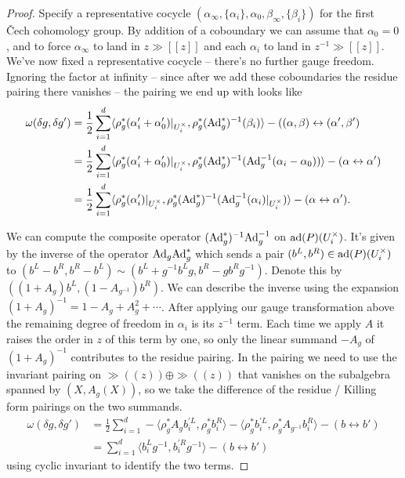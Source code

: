 \documentclass[10pt, oneside]{article}
\newcommand{\Ad}{\mr{Ad}}
\begin{document}
\begin{proof}
 Specify a representative cocycle $(\alpha_\infty, \{\alpha_i\}, \alpha_0, \beta_\infty, \{\beta_i\})$ for the first \v Cech cohomology group. By addition of a coboundary we can assume that $\alpha_0=0$, and to force $\alpha_\infty$ to land in $z\gg[[z]]$ and each $\alpha_i$ to land in $z^{-1}\gg[[z]]$.  We've now fixed a representative cocycle -- there's no further gauge freedom.  Ignoring the factor at infinity -- since after we add these coboundaries the residue pairing there vanishes -- the pairing we end up with looks like 
\begin{align*}
\omega(\delta g, \delta g') &= \frac 12 \sum_{i=1}^d \langle \rho_g^*(\alpha'_i + \alpha'_0)|_{U^\times_i},\rho_g^* (\Ad_g^*)^{-1}( \beta_i) \rangle - ((\alpha,\beta) \leftrightarrow (\alpha',\beta')\\ 
&= \frac 12 \sum_{i=1}^d \langle \rho_g^*(\alpha'_i + \alpha'_0)|_{U^\times_i}, \rho_g^*(\Ad_g^*)^{-1}(\Ad_g^{-1}(\alpha_i - \alpha_0)) \rangle - (\alpha \leftrightarrow \alpha')\\
&= \frac 12 \sum_{i=1}^d \langle \rho_g^*(\alpha'_i)|_{U^\times_i}, \rho_g^*(\Ad_g^*)^{-1}(\Ad_g^{-1}(\alpha_i)|_{U^\times_i}) \rangle - (\alpha \leftrightarrow \alpha').
\end{align*}

We can compute the composite operator $(\Ad_g^*)^{-1}\Ad_g^{-1}$ on $\mathrm{ad}(P)(U^\times_i)$.  It's given by the inverse of the operator $\Ad_g\Ad_g^*$ which sends a pair $(b^L, b^R) \in \mathrm{ad}(P)(U^\times_i)$ to $(b^L - b^R, b^R - b^L) \sim (b^L + g^{-1} b^L g, b^R - g b^R g^{-1})$.  Denote this by $((1+A_g)b^L,(1-A_{g^{-1}})b^R)$.  We can describe the inverse using the expansion $(1+A_g)^{-1} = 1 - A_g + A_g^2 + \cdots$.  After applying our gauge transformation above the remaining degree of freedom in $\alpha_i$ is its $z^{-1}$ term.  Each time we apply $A$ it raises the order in $z$ of this term by one, so only the linear summand $-A_g$ of $(1+A_g)^{-1}$ contributes to the residue pairing.  In the pairing we need to use the invariant pairing on $\gg((z)) \oplus \gg((z))$ that vanishes on the subalgebra spanned by $(X, A_g(X))$, so we take the difference of the residue / Killing form pairings on the two summands.
\begin{align*}
\omega(\delta g, \delta g') &= \frac 12 \sum_{i=1}^d  - \langle \rho_g^*A_g b^{'L}_i, \rho_g^*b^{R}_i \rangle - \langle \rho_g^*b^{'L}_i, \rho_g^*A_{g^{-1}}b^{R}_i \rangle- (b \leftrightarrow b') \\ 
&= \sum_{i=1}^d \langle b^L_ig^{-1}, b^{'R}_i g^{-1} \rangle  - (b \leftrightarrow b')
\end{align*}
using cyclic invariant to identify the two terms. 
\end{proof}
\end{document}
